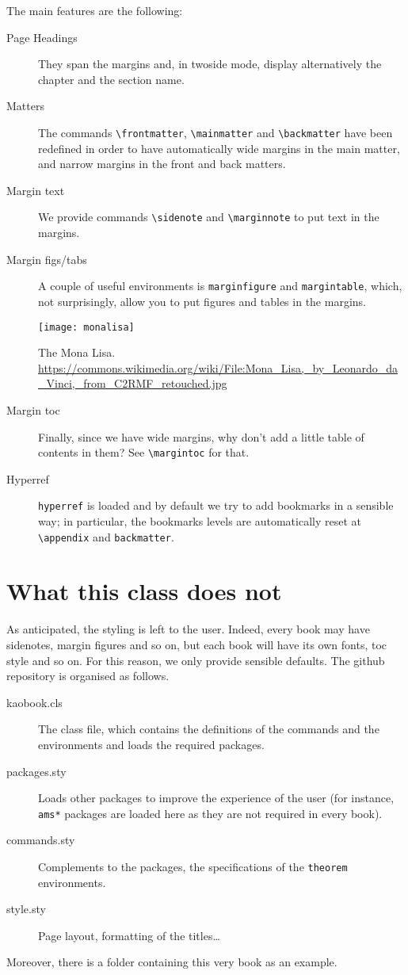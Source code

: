 The main features are the following:

\begin{description}
	\item[Page Headings] They span the margins and, in twoside mode, 
		display alternatively the chapter and the section name.
	\item[Matters] The commands \verb|\frontmatter|, \verb|\mainmatter| 
		and \verb|\backmatter| have been redefined in order to have 
		automatically wide margins in the main matter, and narrow 
		margins in the front and back matters.
	\item[Margin text] We provide commands \verb|\sidenote| and 
		\verb|\marginnote| to put text in the 
		margins.
	\item[Margin figs/tabs] A couple of useful environments is 
		\verb|marginfigure| and \verb|margintable|, which, not 
		surprisingly, allow you to put figures and tables in the 
		margins.
		\begin{marginfigure}[*-3]
			\texttt{[image: monalisa]}
			\caption[The Mona Lisa]{The Mona Lisa.\\
				\url{https://commons.wikimedia.org/wiki/File:Mona_Lisa,_by_Leonardo_da_Vinci,_from_C2RMF_retouched.jpg}}
		\end{marginfigure}
	\item[Margin toc] Finally, since we have wide margins, why don't add 
		a little table of contents in them? See \verb|\margintoc| for 
		that.
	\item[Hyperref] \verb|hyperref| is loaded and by default we try to 
		add bookmarks in a sensible way; in particular, the bookmarks 
		levels are automatically reset at \verb|\appendix| and 
		\verb|backmatter|.
\end{description}

\section{What this class does not}

As anticipated, the styling is left to the user. Indeed, every book may 
have sidenotes, margin figures and so on, but each book will have its 
own fonts, toc style and so on. For this reason, we only provide 
sensible defaults. The github repository is organised as follows.

\begin{description}
	\item[kaobook.cls] The class file, which contains the definitions of 
		the commands and the environments and loads the required 
		packages.
	\item[packages.sty] Loads other packages to improve the experience 
		of the user (for instance, \verb|ams*| packages are loaded here 
		as they are not required in every book).
	\item[commands.sty] Complements to the packages, \eg the 
		specifications of the \verb|theorem| environments.
	\item[style.sty] Page layout, formatting of the titles\ldots
\end{description}

Moreover, there is a folder containing this very book as an example.
